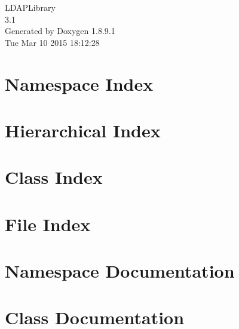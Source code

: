 \documentclass[twoside]{book}
\newcommand{\+}{\discretionary{\mbox{\scriptsize$\hookleftarrow$}}{}{}}
\newcommand{\clearemptydoublepage}{%
  \newpage{\pagestyle{empty}\cleardoublepage}%
}
\begin{document}
\hypersetup{pageanchor=false,
             bookmarks=true,
             bookmarksnumbered=true,
             pdfencoding=unicode
            }
\begin{titlepage}
\vspace*{7cm}
\begin{center}%
{\Large L\+D\+A\+P\+Library \\[1ex]\large 3.\+1 }\\
\vspace*{1cm}
{\large Generated by Doxygen 1.8.9.1}\\
\vspace*{0.5cm}
{\small Tue Mar 10 2015 18:12:28}\\
\end{center}
\end{titlepage}
\clearemptydoublepage
\tableofcontents
\clearemptydoublepage
{}
\hypersetup{pageanchor=true}

\chapter{Namespace Index}

\chapter{Hierarchical Index}

\chapter{Class Index}

\chapter{File Index}

\chapter{Namespace Documentation}






\chapter{Class Documentation}











\end{document}

